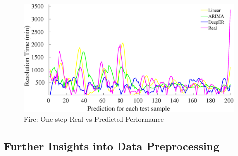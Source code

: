



\begin{figure}[!ht]
  \centering
  	\label{fig:qualfire}
       \includegraphics[scale=0.25]{Figures/15_5/Dist/1Fire_main_5}
	\caption{Fire: One step Real vs Predicted Performance}
  \label{fig:qualitative} 
  \vspace{-3mm}
\end{figure}





\subsection{Further Insights into Data Preprocessing}


